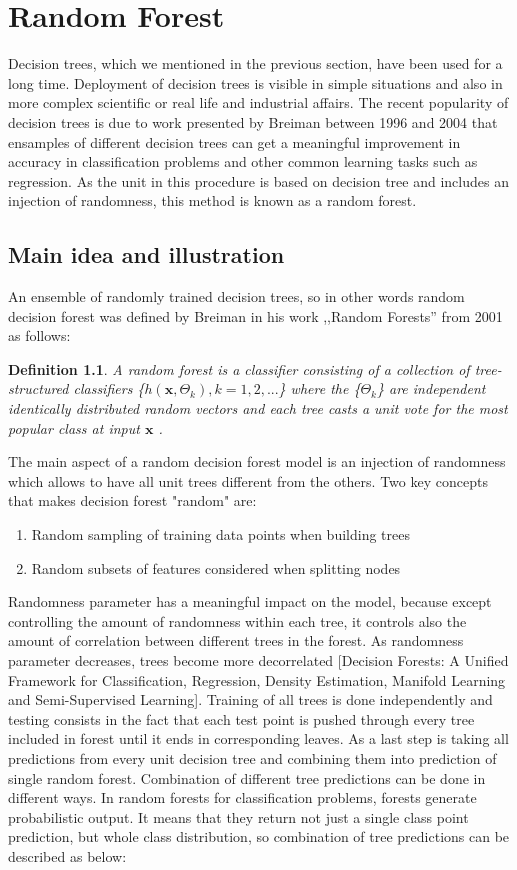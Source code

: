 
\chapter{Random Forest}
Decision trees, which we mentioned in the previous section, have been used for a long time. Deployment of decision trees is visible in simple situations and also in more complex scientific or real life and industrial affairs. The recent popularity of decision trees is due to work presented by Breiman between 1996 and 2004 that ensamples of different decision trees can get a meaningful improvement in accuracy in classification problems and other common learning tasks such as regression. As the unit in this procedure is based on decision tree and includes an injection of randomness, this method is known as a random forest. 

\section{Main idea and illustration}
An ensemble of randomly trained decision trees, so in other words random decision forest was defined by Breiman in his work ,,Random Forests”  from 2001 as follows:

\newtheorem{theorem}{Definition}
\begin{theorem}
A random forest is a classifier consisting of a collection of tree-structured classifiers \{${h(\textbf{x},\Theta_{k})}, k = 1,2,...$\} where the \{$\Theta_{k}$\} are independent identically
distributed random vectors and each tree casts a unit vote for the most popular class at input $\textbf{x}$ .
\end{theorem}
The main aspect of a random decision forest model is an injection of randomness which allows to have all unit trees different from the others. Two key concepts that makes decision forest "random" are:
\begin{enumerate}
\item Random sampling of training data points when building trees
\item Random subsets of features considered when splitting nodes
\end{enumerate}
Randomness parameter has a meaningful impact on the model, because except controlling the amount of randomness within each tree, it controls also the amount of correlation between different trees in the forest. As randomness parameter decreases, trees become more decorrelated [Decision Forests: A Unified Framework for Classification, Regression, Density Estimation, Manifold Learning and Semi-Supervised Learning]. Training of all trees is done independently and testing consists in the fact that each test point is pushed through every tree included in forest until it ends in corresponding leaves. As a last step is taking all predictions from every unit decision tree and combining them into prediction of single random forest. Combination of different tree predictions can be done in different ways. In random forests for classification problems, forests generate probabilistic output. It means that they return not just a single class point prediction, but whole class distribution, so combination of tree predictions can be described as below:

